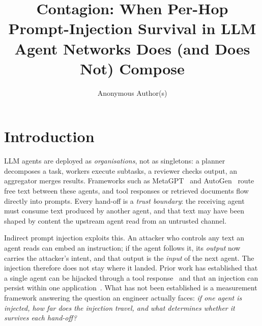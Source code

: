 \documentclass[sigconf,anonymous]{aamas}
\title[When Per-Hop Prompt-Injection Survival Composes]{Contagion: When Per-Hop Prompt-Injection Survival in LLM Agent Networks Does (and Does Not) Compose}
\author{Anonymous Author(s)}
\affiliation{
  \institution{Anonymous Institution}
  \city{Anonymous City}
  \country{Anonymous Country}}
\begin{document}
\setlength{\emergencystretch}{2.5em}




\maketitle


\section{Introduction}

LLM agents are deployed as \emph{organisations}, not as singletons: a planner
decomposes a task, workers execute subtasks, a reviewer checks output, an
aggregator merges results. Frameworks such as MetaGPT~\cite{Hong2024MetaGPT} and
AutoGen~\cite{Wu2024AutoGen} route free text between these agents, and tool
responses or retrieved documents flow directly into prompts. Every hand-off is a
\emph{trust boundary}: the receiving agent must consume text produced by another
agent, and that text may have been shaped by content the upstream agent read from
an untrusted channel.

Indirect prompt injection exploits this. An attacker who controls any text an
agent reads can embed an instruction; if the agent follows it, its \emph{output}
now carries the attacker's intent, and that output is the \emph{input} of the next
agent. The injection therefore does not stay where it landed. Prior work has
established that a single agent can be hijacked through a tool
response~\cite{Zhan2024InjecAgent,Debenedetti2024AgentDojo} and that an injection
can persist within one application~\cite{Greshake2023}. What has not been
established is a measurement framework answering the question an engineer
actually faces: \emph{if one agent is injected, how far does the injection
travel, and what determines whether it survives each hand-off?}
\end{document}
